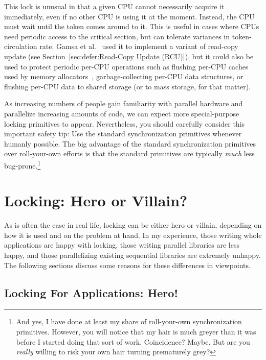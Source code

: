 This lock is unusual in that a given CPU cannot necessarily acquire it
immediately, even if no other CPU is using it at the moment.
Instead, the CPU must wait until the token comes around to it.
This is useful in cases where CPUs need periodic access to the critical
section, but can tolerate variances in token-circulation rate.
Gamsa et al.~\cite{Gamsa99} used it to implement a variant of
read-copy update (see Section~\ref{sec:defer:Read-Copy Update (RCU)}),
but it could also be used to protect periodic per-CPU operations such
as flushing per-CPU caches used by memory allocators~\cite{McKenney93},
garbage-collecting per-CPU data structures, or flushing per-CPU
data to shared storage (or to mass storage, for that matter).

As increasing numbers of people gain familiarity with parallel hardware
and parallelize increasing amounts of code, we can expect more
special-purpose locking primitives to appear.
Nevertheless, you should carefully consider this important safety tip:
Use the standard synchronization primitives whenever humanly possible.
The big advantage of the standard synchronization primitives over
roll-your-own efforts is that the standard primitives are typically
\emph{much} less bug-prone.\footnote{
	And yes, I have done at least my share of roll-your-own
	synchronization primitives.
	However, you will notice that my hair is much greyer than
	it was before I started doing that sort of work.
	Coincidence?
	Maybe.
	But are you \emph{really} willing to risk your own hair turning
	prematurely grey?}



\section{Locking: Hero or Villain?}
\label{sec:locking:Locking: Hero or Villain?}

As is often the case in real life, locking can be either hero or villain,
depending on how it is used and on the problem at hand.
In my experience, those writing whole applications are happy with
locking, those writing parallel libraries are less happy, and those
parallelizing existing sequential libraries are extremely unhappy.
The following sections discuss some reasons for these differences in
viewpoints.

\subsection{Locking For Applications: Hero!}
\label{sec:locking:Locking For Applications: Hero!}

